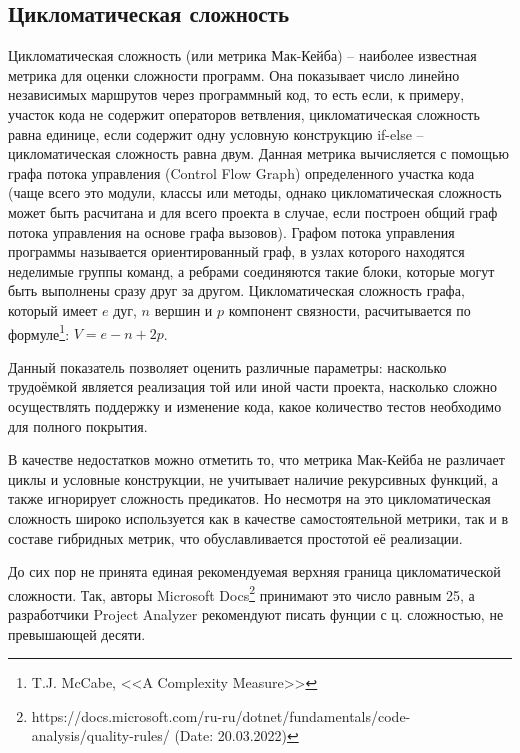 \subsection{Цикломатическая сложность}
Цикломатическая сложность (или метрика Мак-Кейба) -- наиболее известная
метрика для оценки сложности программ. Она показывает число линейно независимых маршрутов
через программный код, то есть если, к примеру, участок кода не содержит операторов ветвления, цикломатическая сложность равна единице, если содержит одну условную конструкцию
if-else -- цикломатическая сложность равна двум. Данная метрика 
вычисляется с помощью графа потока управления (Control Flow Graph) 
определенного участка кода (чаще всего это модули, классы или методы, однако цикломатическая сложность может быть расчитана и для всего проекта в случае, если построен общий граф потока управления на основе графа вызовов).
Графом	потока управления программы называется ориентированный граф,	 в	узлах	которого находятся	неделимые группы	команд,	а ребрами	соединяются такие	блоки,	которые	могут	быть	выполнены	
сразу	друг	за	другом. Цикломатическая сложность графа, который имеет
$e$ дуг, $n$ вершин и $p$ компонент связности, 
расчитывается по формуле\footnote{T.J. McCabe, <<A Complexity Measure>>}: $V = e - n + 2p$.  

Данный показатель позволяет оценить различные параметры: насколько трудоёмкой является реализация той или иной части проекта, насколько сложно осуществлять поддержку и изменение кода, какое количество тестов необходимо для полного покрытия.

В качестве недостатков можно отметить то, что метрика Мак-Кейба не различает
циклы и условные конструкции, не учитывает наличие рекурсивных функций,
а также игнорирует сложность предикатов. Но несмотря на это цикломатическая сложность широко используется как в качестве самостоятельной метрики, так и в составе гибридных метрик, что обуславливается простотой её реализации.

До сих пор не принята единая рекомендуемая верхняя граница цикломатической сложности. Так, авторы Microsoft Docs\footnote{https://docs.microsoft.com/ru-ru/dotnet/fundamentals/code-analysis/quality-rules/ (Date: 20.03.2022)}  принимают это число равным 25, а разработчики Project Analyzer
рекомендуют писать фунции с ц. сложностью, не превышающей десяти.
